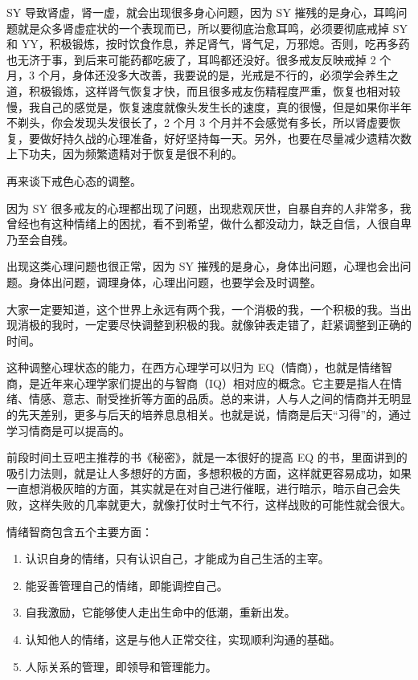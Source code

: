 \documentclass[fontset=founder]{ctexart}
\begin{document}
SY 导致肾虚，肾一虚，就会出现很多身心问题，因为 SY 摧残的是身心，耳鸣问题就是众多肾虚症状的一个表现而已，所以要彻底治愈耳鸣，必须要彻底戒掉 SY 和 YY，积极锻炼，按时饮食作息，养足肾气，肾气足，万邪熄。否则，吃再多药也无济于事，到后来可能药都吃疲了，耳鸣都还没好。很多戒友反映戒掉 2 个月，3 个月，身体还没多大改善，我要说的是，光戒是不行的，必须学会养生之道，积极锻炼，这样肾气恢复才快，而且很多戒友伤精程度严重，恢复也相对较慢，我自己的感觉是，恢复速度就像头发生长的速度，真的很慢，但是如果你半年不剃头，你会发现头发很长了，2 个月 3 个月并不会感觉有多长，所以肾虚要恢复，要做好持久战的心理准备，好好坚持每一天。另外，也要在尽量减少遗精次数上下功夫，因为频繁遗精对于恢复是很不利的。

再来谈下戒色心态的调整。

因为 SY 很多戒友的心理都出现了问题，出现悲观厌世，自暴自弃的人非常多，我曾经也有这种情绪上的困扰，看不到希望，做什么都没动力，缺乏自信，人很自卑乃至会自残。

出现这类心理问题也很正常，因为 SY 摧残的是身心，身体出问题，心理也会出问题。身体出问题，调理身体，心理出问题，也要学会及时调整。

大家一定要知道，这个世界上永远有两个我，一个消极的我，一个积极的我。当出现消极的我时，一定要尽快调整到积极的我。就像钟表走错了，赶紧调整到正确的时间。

这种调整心理状态的能力，在西方心理学可以归为 EQ（情商），也就是情绪智商，是近年来心理学家们提出的与智商（IQ）相对应的概念。它主要是指人在情绪、情感、意志、耐受挫折等方面的品质。总的来讲，人与人之间的情商并无明显的先天差别，更多与后天的培养息息相关。也就是说，情商是后天“习得”的，通过学习情商是可以提高的。

前段时间土豆吧主推荐的书《秘密》，就是一本很好的提高 EQ 的书，里面讲到的吸引力法则，就是让人多想好的方面，多想积极的方面，这样就更容易成功，如果一直想消极灰暗的方面，其实就是在对自己进行催眠，进行暗示，暗示自己会失败，这样失败的几率就更大，就像打仗时士气不行，这样战败的可能性就会很大。

情绪智商包含五个主要方面：

\begin{enumerate}
    \item 认识自身的情绪，只有认识自己，才能成为自己生活的主宰。
    \item 能妥善管理自己的情绪，即能调控自己。
    \item 自我激励，它能够使人走出生命中的低潮，重新出发。
    \item 认知他人的情绪，这是与他人正常交往，实现顺利沟通的基础。
    \item 人际关系的管理，即领导和管理能力。
\end{enumerate}
\end{document}
